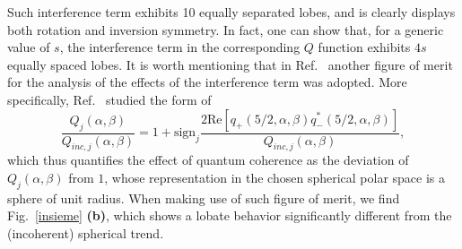 Such interference term exhibits 10 equally separated lobes, and is clearly displays both rotation and inversion symmetry. In fact, one can show that, for a generic value of $s$, the interference term in the corresponding $Q$ function exhibits $4s$ equally spaced lobes. It is worth mentioning that in Ref.~\cite{agarwal1997atomic} another figure of merit for the analysis of the effects of the interference term was adopted. More specifically, Ref.~\cite{agarwal1997atomic} studied the form of 
\begin{equation}
\frac{Q_j(\alpha,\beta)}{Q_{inc,j}(\alpha,\beta)}=1+\text{sign}_j\frac{2\text{Re}[q_+(5/2,\alpha,\beta)q^*_-(5/2,\alpha,\beta)]}{Q_{inc,j}(\alpha,\beta)},
\end{equation}
which thus quantifies the effect of quantum coherence as the deviation of $Q_j(\alpha,\beta)$ from $1$, whose representation in the chosen spherical polar space is a sphere of unit radius. When making use of such figure of merit, we find Fig.~\ref{insieme} {\bf (b)}, which shows a lobate behavior significantly different from the (incoherent) spherical trend. 
